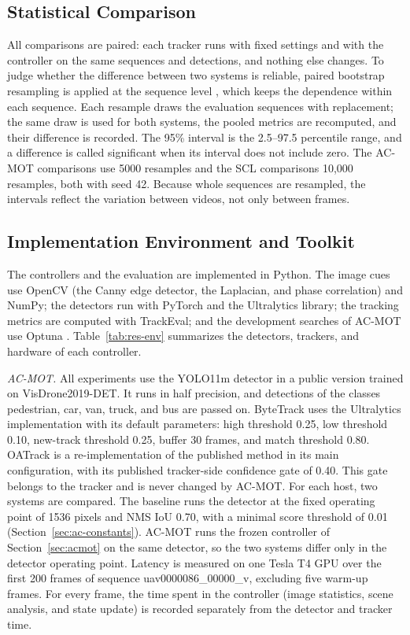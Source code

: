 \subsection{Statistical Comparison}\label{sec:res-bootstrap}
All comparisons are paired: each tracker runs with fixed settings and with the controller on the same sequences and detections, and nothing else changes. To judge whether the difference between two systems is reliable, paired bootstrap resampling is applied at the sequence level \cite{efron2016casi}, which keeps the dependence within each sequence. Each resample draws the evaluation sequences with replacement; the same draw is used for both systems, the pooled metrics are recomputed, and their difference is recorded. The 95\% interval is the 2.5--97.5 percentile range, and a difference is called significant when its interval does not include zero. The AC-MOT comparisons use 5000 resamples and the SCL comparisons 10,000 resamples, both with seed 42. Because whole sequences are resampled, the intervals reflect the variation between videos, not only between frames.

\subsection{Implementation Environment and Toolkit}\label{sec:res-env}
The controllers and the evaluation are implemented in Python. The image cues use OpenCV (the Canny edge detector, the Laplacian, and phase correlation) and NumPy; the detectors run with PyTorch and the Ultralytics library; the tracking metrics are computed with TrackEval; and the development searches of AC-MOT use Optuna \cite{akiba2019optuna}. Table~\ref{tab:res-env} summarizes the detectors, trackers, and hardware of each controller.

\emph{AC-MOT.} All experiments use the YOLO11m detector \cite{jocher2024yolo11} in a public version trained on VisDrone2019-DET. It runs in half precision, and detections of the classes pedestrian, car, van, truck, and bus are passed on. ByteTrack uses the Ultralytics implementation with its default parameters: high threshold 0.25, low threshold 0.10, new-track threshold 0.25, buffer 30 frames, and match threshold 0.80. OATrack is a re-implementation of the published method \cite{qi2026oatrack} in its main configuration, with its published tracker-side confidence gate of 0.40. This gate belongs to the tracker and is never changed by AC-MOT. For each host, two systems are compared. The baseline runs the detector at the fixed operating point of 1536 pixels and NMS IoU 0.70, with a minimal score threshold of 0.01 (Section~\ref{sec:ac-constants}). AC-MOT runs the frozen controller of Section~\ref{sec:acmot} on the same detector, so the two systems differ only in the detector operating point. Latency is measured on one Tesla T4 GPU over the first 200 frames of sequence uav0000086\_00000\_v, excluding five warm-up frames. For every frame, the time spent in the controller (image statistics, scene analysis, and state update) is recorded separately from the detector and tracker time.

